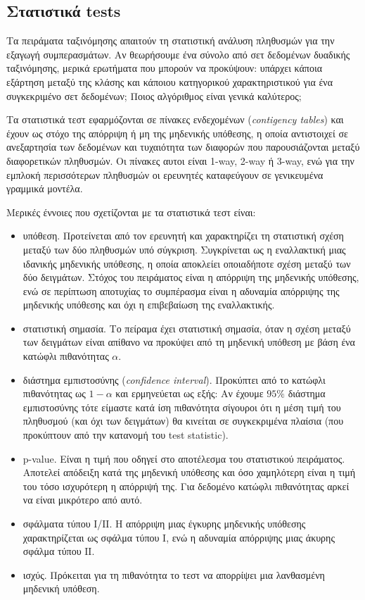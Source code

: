 \documentclass[]{article}
\numberwithin{equation}{section}		%
\numberwithin{figure}{section}			%
\numberwithin{table}{section}				%
\begin{document}
    \subsection{Στατιστικά tests}
    Τα πειράματα ταξινόμησης απαιτούν τη στατιστική ανάλυση πληθυσμών για την εξαγωγή συμπερασμάτων. Αν θεωρήσουμε ένα σύνολο από σετ δεδομένων δυαδικής ταξινόμησης, μερικά ερωτήματα που μπορούν να προκύψουν: υπάρχει κάποια εξάρτηση μεταξύ της κλάσης και κάποιου κατηγορικού χαρακτηριστικού για ένα συγκεκριμένο σετ δεδομένων; Ποιος αλγόριθμος είναι γενικά καλύτερος;
    
    Τα στατιστικά τεστ εφαρμόζονται σε πίνακες ενδεχομένων (\textit{contigency tables}) και έχουν ως στόχο της απόρριψη ή μη της μηδενικής υπόθεσης, η οποία αντιστοιχεί σε ανεξαρτησία των δεδομένων και τυχαιότητα των διαφορών που παρουσιάζονται μεταξύ διαφορετικών πληθυσμών. Οι πίνακες αυτοι είναι 1-way, 2-way ή 3-way, ενώ για την εμπλοκή περισσότερων πληθυσμών οι ερευνητές καταφεύγουν σε γενικευμένα γραμμικά μοντέλα. \citet{Introduction}
    
    Μερικές έννοιες που σχετίζονται με τα στατιστικά τεστ είναι:
    \begin{itemize}
    	\item υπόθεση. Προτείνεται από τον ερευνητή και χαρακτηρίζει τη στατιστική σχέση μεταξύ των δύο πληθυσμών υπό σύγκριση. Συγκρίνεται ως η εναλλακτική μιας ιδανικής μηδενικής υπόθεσης, η οποία αποκλείει οποιαδήποτε σχέση μεταξύ των δύο δειγμάτων. Στόχος του πειράματος είναι η απόρριψη της μηδενικής υπόθεσης, ενώ σε περίπτωση αποτυχίας το συμπέρασμα είναι η αδυναμία απόρριψης της μηδενικής υπόθεσης και όχι η επιβεβαίωση της εναλλακτικής.
    	\item στατιστική σημασία. Το πείραμα έχει στατιστική σημασία, όταν η σχέση μεταξύ των δειγμάτων είναι απίθανο να προκύψει από τη μηδενική υπόθεση με βάση ένα κατώφλι πιθανότητας $\alpha$.
    	\item διάστημα εμπιστοσύνης (\textit{confidence interval}). Προκύπτει από το κατώφλι πιθανότητας ως $1-\alpha$ και ερμηνεύεται ως εξής: Αν έχουμε $95 \%$ διάστημα εμπιστοσύνης τότε είμαστε κατά ίση πιθανότητα σίγουροι ότι η μέση τιμή του πληθυσμού (και όχι των δειγμάτων) θα κινείται σε συγκεκριμένα πλαίσια (που προκύπτουν από την κατανομή του test statistic).
    	\item p-value. Είναι η τιμή που οδηγεί στο αποτέλεσμα του στατιστικού πειράματος. Αποτελεί απόδειξη κατά της μηδενική υπόθεσης και όσο χαμηλότερη είναι η τιμή του τόσο ισχυρότερη η απόρριψή της. Για δεδομένο κατώφλι πιθανότητας αρκεί να είναι μικρότερο από αυτό.
    	\item σφάλματα τύπου Ι/ΙΙ. Η απόρριψη μιας έγκυρης μηδενικής υπόθεσης χαρακτηρίζεται ως σφάλμα τύπου Ι, ενώ η αδυναμία απόρριψης μιας άκυρης σφάλμα τύπου ΙΙ.
    	\item ισχύς. Πρόκειται για τη πιθανότητα το τεστ να απορρίψει μια λανθασμένη μηδενική υπόθεση.
    \end{itemize}
\end{document}
